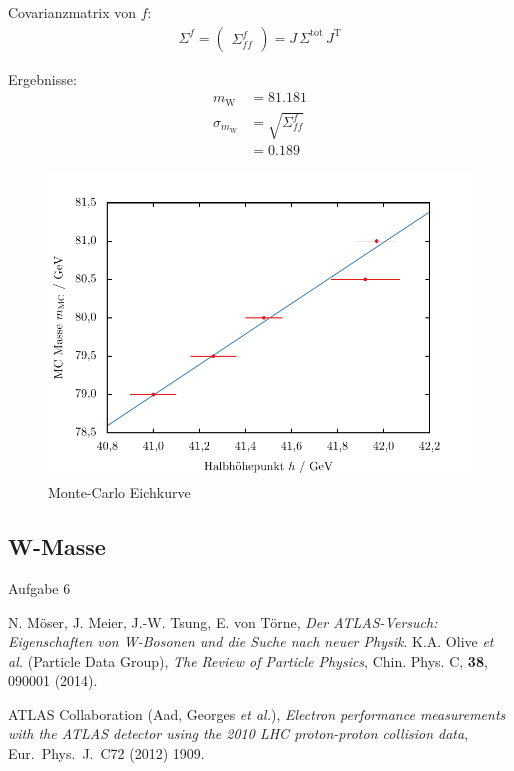 \documentclass[11pt, a4paper]{article}
\numberwithin{equation}{section}
\begin{document}
Covarianzmatrix von $f$:
\begin{align*}
	\Sigma^f = \begin{pmatrix}
	\Sigma^f_{ff}
	\end{pmatrix} = J \, \Sigma^\mathrm{tot} \, J^\mathrm{T}
\end{align*}

Ergebnisse:
\begin{align*}
	m_\mathrm{W} &= \num{81.181} \\
	\sigma_{m_\mathrm{W}} &= \sqrt{\Sigma^f_{ff}} \\
	&= \num{0.189}
\end{align*}



\begin{figure}[h]
	\centering
	\includegraphics{./figures/wmass/gauge.pdf}
	\caption{Monte-Carlo Eichkurve}
\end{figure}

\subsection{W-Masse}
Aufgabe 6



\FloatBarrier
\vspace{\fill}
\begin{thebibliography}{19}
	N. Möser, J. Meier, J.-W. Tsung, E. von Törne,
	\emph{Der ATLAS-Versuch: Eigenschaften von W-Bosonen und die Suche nach neuer Physik}.
	K.A. Olive \textit{et al.} (Particle Data Group),
	\emph{The Review of Particle Physics},
	Chin. Phys. C, \textbf{38}, 090001 (2014).

	ATLAS Collaboration (Aad, Georges \textit{et al.}),
	\emph{Electron performance measurements with the ATLAS detector using the 2010 LHC proton-proton collision data},
	Eur.\ Phys.\ J.\ C72 (2012) 1909.

\end{thebibliography}
\end{document}
